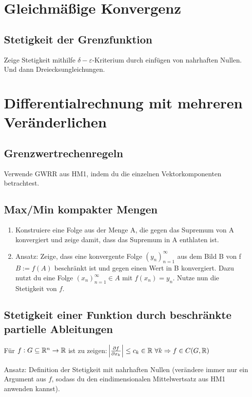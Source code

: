 \section{Gleichmäßige Konvergenz}

\subsection{Stetigkeit der Grenzfunktion}
Zeige Stetigkeit mithilfe $\delta-\varepsilon$-Kriterium
durch einfügen von nahrhaften Nullen. Und dann Dreiecksungleichungen.

\section{Differentialrechnung mit mehreren Veränderlichen}
\subsection{Grenzwertrechenregeln}
Verwende GWRR aus HM1, indem du die einzelnen Vektorkomponenten betrachtest.

\subsection{Max/Min kompakter Mengen}
\begin{enumerate}[label= (\alph*)]
 \item Konstruiere eine Folge aus der Menge A, die gegen das Supremum von A
 konvergiert und zeige damit, dass das Supremum in A enthlaten ist.
 \item Ansatz: Zeige, dass eine konvergente Folge ${(y_n)}_{n=1}^\infty$ aus
 dem Bild B von f $B:=f(A)$ beschränkt ist und gegen einen Wert in B konvergiert.
 Dazu nutzt du eine Folge ${(x_n)}_{n=1}^\infty \in A$ mit $f(x_n) = y_n$. Nutze
 nun die Stetigkeit von $f$.
\end{enumerate}

\subsection{Stetigkeit einer Funktion durch beschränkte partielle Ableitungen} \label{HM2:DiffTotAbl}
Für $f:G\subseteq \mathbb{R}^n \rightarrow \mathbb{R}$ ist zu zeigen:
$\abs{\frac{\partial f}{\partial x_k}} \leq c_k \in \mathbb{R} \ \forall k \Rightarrow f \in C(G,\mathbb{R})$

Ansatz: Definition der Stetigkeit mit nahrhaften Nullen (verändere immer nur ein
Argument aus $f$, sodass du den eindimensionalen Mittelwertsatz aus HM1 anwenden kannst).

